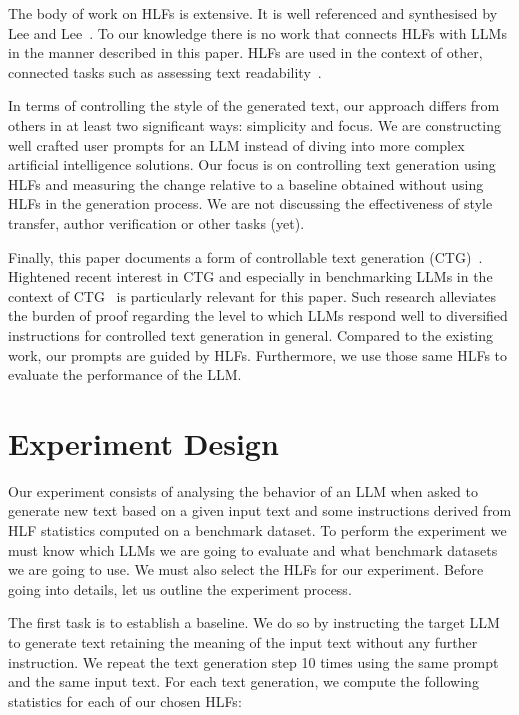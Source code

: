 \documentclass[runningheads,a4paper,11pt]{article}
\begin{document}
The body of work on HLFs is extensive.
It is well referenced and synthesised by Lee and Lee~\cite{lftk-2023}.
To our knowledge there is no work that connects HLFs with LLMs in the manner
described in this paper.
HLFs are used in the context of other, connected tasks such as assessing text
readability~\cite{lee-etal-2021-pushing}.

In terms of controlling the style of the generated text, our approach differs
from others in at least two significant ways: simplicity and focus.
We are constructing well crafted user prompts for an LLM instead of diving into
more complex artificial intelligence solutions.
Our focus is on controlling text generation using HLFs and measuring the change
relative to a baseline obtained without using HLFs in the generation process.
We are not discussing the effectiveness of style transfer, author verification
or other tasks (yet).

Finally, this paper documents a form of controllable text generation
(CTG)~\cite{zhang-ctg-2022}.
Hightened recent interest in CTG and especially in benchmarking LLMs in the
context of CTG~\cite{chen2024benchmarking} is particularly relevant for this
paper.
Such research alleviates the burden of proof regarding the level to which
LLMs respond well to diversified instructions for controlled text generation in
general.
Compared to the existing work, our prompts are guided by HLFs.
Furthermore, we use those same HLFs to evaluate the performance of the LLM.


\section{Experiment Design}\label{method}

Our experiment consists of analysing the behavior of an LLM when asked to
generate new text based on a given input text and some instructions derived from
HLF statistics computed on a benchmark dataset.
To perform the experiment we must know which LLMs we are going to evaluate and
what benchmark datasets we are going to use.
We must also select the HLFs for our experiment.
Before going into details, let us outline the experiment process.

The first task is to establish a baseline.
We do so by instructing the target LLM to generate text retaining the meaning of
the input text without any further instruction.
We repeat the text generation step 10 times using the same prompt and the same
input text.
For each text generation, we compute the following statistics for each of our
chosen HLFs:
\end{document}
